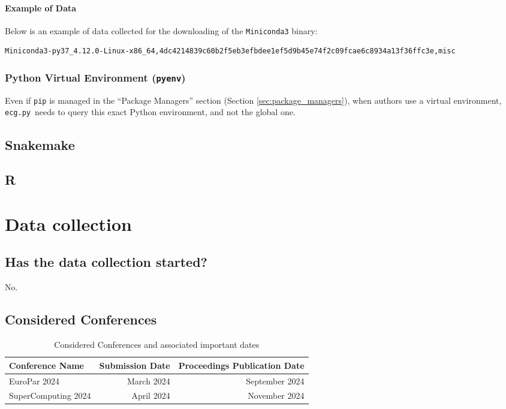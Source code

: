 \documentclass{article}
\newcommand{\ecg}{\texttt{ecg.py}}
\begin{document}
\paragraph{Example of Data}

Below is an example of data collected for the downloading of the \texttt{Miniconda3} binary:

\begin{lstlisting}
Miniconda3-py37_4.12.0-Linux-x86_64,4dc4214839c60b2f5eb3efbdee1ef5d9b45e74f2c09fcae6c8934a13f36ffc3e,misc
\end{lstlisting}

\subsubsection{Python Virtual Environment (\texttt{pyenv})}\label{sec:pyenv}

Even if \texttt{pip} is managed in the ``Package Managers'' section (Section \ref{sec:package_managers}), when authors use a virtual environment, \ecg\ needs to query this exact Python environment, and not the global one.

\subsection{Snakemake}

\subsection{R}

\section{Data collection}

\subsection{Has the data collection started?}

No.

\subsection{Considered Conferences}

\begin{table}
  \centering
  \begin{tabular}{lrr}
    \toprule
    Conference Name     & Submission Date & Proceedings Publication Date\\
    \midrule
    EuroPar 2024        & March 2024      & September 2024\\
    SuperComputing 2024 & April 2024      & November 2024 \\
    \bottomrule
\end{tabular}
  \caption{Considered Conferences and associated important dates}
  \label{tab:conferences}
\end{table}
\end{document}
